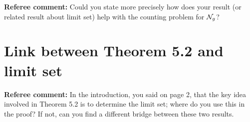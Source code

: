 \documentclass[12pt, reqno]{amsart}
\begin{document}
\textbf{Referee comment:} Could you state more precisely how does your result (or related result about limit set) help with the counting problem for $\mathcal{N}_g$?

\section{Link between Theorem 5.2 and limit set}
\label{sec:link-between-theorem}

\textbf{Referee comment:} In the introduction, you said on page 2, that the key idea involved in Theorem 5.2 is to determine the limit set; where do you use this in the proof? If not, can you find a different bridge between these two results.
\end{document}
